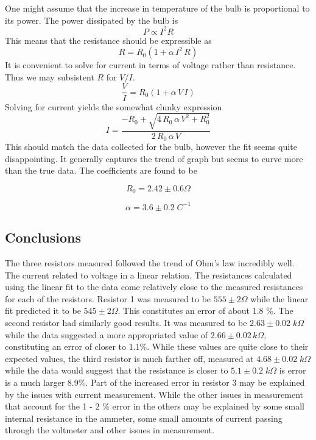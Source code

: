 \documentclass[11pt]{article}
\begin{document}
One might assume that the increase in temperature of the bulb is proportional to its power. The power dissipated by the bulb is 
\begin{equation}
P \propto I^2 R
\end{equation}
This means that the resistance should be expressible as
\begin{equation}
R = R_0 (1 + \alpha \, I^2 \, R)
\end{equation}
It is convenient to solve for current in terms of voltage rather than resistance. Thus we may subsistent \(R\) for \(V/I\).
\begin{equation}
\frac{V}{I} = R_0 (1 + \alpha \, V \, I)
\end{equation}
Solving for current yields the somewhat clunky expression
\begin{equation}
I = \frac{-R_0 + \sqrt{4\,R_0\, \alpha \, V^2 + R_0^2}}{2\, R_0 \, \alpha \, V}
\end{equation}
This should match the data collected for the bulb, however the fit seems quite disappointing. It generally captures the trend of graph but seems to curve more than the true data. The coefficients are found to be

\[R_0 = 2.42 \pm 0.6 \Omega \]

\[\alpha = 3.6 \pm 0.2 \; C^{-1} \]

\subsection{Conclusions}
The three resistors measured followed the trend of Ohm's law incredibly well. The current related to voltage in a linear relation. The resistances calculated using the linear fit to the data come relatively close to the measured resistances for each of the resistors. Resistor 1 was measured to be \(555 \pm 2 \Omega \) while the linear fit predicted it to be \(545 \pm 2 \Omega \). This constitutes an error of about 1.8 \%. The second resistor had similarly good results. It  was measured to be \( 2.63 \pm 0.02 \; k \Omega \) while the data suggested a more appropriated value of  \( 2.66 \pm 0.02 \,k  \Omega \), constituting an error of closer to 1.1\%. While these values are quite close to their expected values, the third resistor is much farther off, measured at \( 4.68 \pm 0.02 \; k \Omega \) while the data would suggest that the resistance is closer to \( 5.1 \pm 0.2 \; k \Omega \) is error is a much larger 8.9\%. Part of the increased error in resistor 3 may be explained by the issues with current measurement. While the other issues in measurement that account for the 1 - 2 \% error in the others may be explained by some small internal resistance in the ammeter, some small amounts of current passing through the voltmeter and other issues in measurement.
\end{document}
